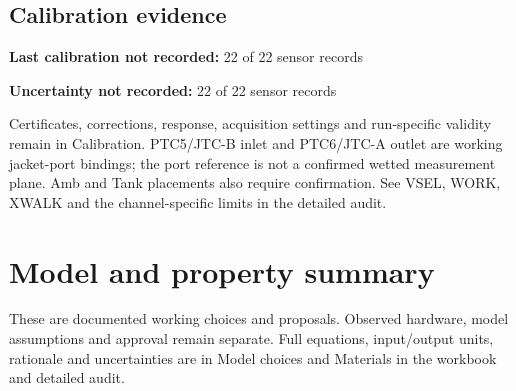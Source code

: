\documentclass[11pt]{article}
\begin{document}
\subsection*{Calibration evidence}
\textbf{Last calibration not recorded:} 22 of 22 sensor records\par
\textbf{Uncertainty not recorded:} 22 of 22 sensor records\par
Certificates, corrections, response, acquisition settings and run-specific validity remain in Calibration. PTC5/JTC-B inlet and PTC6/JTC-A outlet are working jacket-port bindings; the port reference is not a confirmed wetted measurement plane. Amb and Tank placements also require confirmation. See VSEL, WORK, XWALK and the channel-specific limits in the detailed audit.
\clearpage\section{Model and property summary}\label{model-records}
These are documented working choices and proposals. Observed hardware, model assumptions and approval remain separate. Full equations, input/output units, rationale and uncertainties are in Model choices and Materials in the workbook and detailed audit.
\begingroup\small\setlength{\tabcolsep}{4pt}
\end{document}
